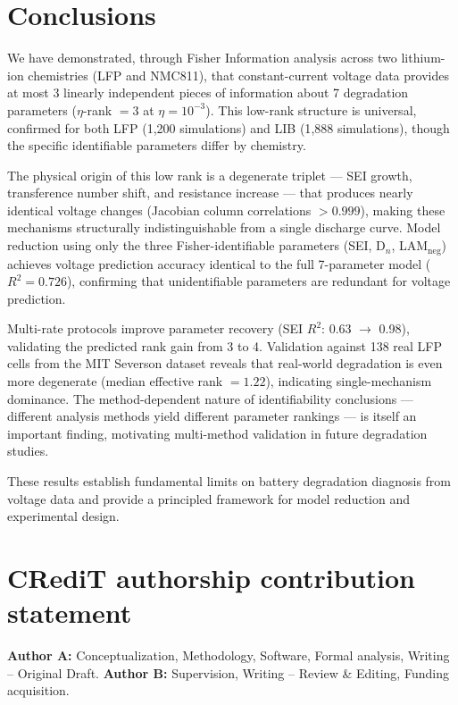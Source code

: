 \documentclass[preprint,12pt]{elsarticle}
\begin{document}
\section{Conclusions}
\label{sec:conclusion}

We have demonstrated, through Fisher Information analysis across two lithium-ion chemistries (LFP and NMC811), that constant-current voltage data provides at most 3 linearly independent pieces of information about 7 degradation parameters ($\eta$-rank $= 3$ at $\eta = 10^{-3}$).
This low-rank structure is universal, confirmed for both LFP (1{,}200 simulations) and LIB (1{,}888 simulations), though the specific identifiable parameters differ by chemistry.

The physical origin of this low rank is a degenerate triplet --- SEI growth, transference number shift, and resistance increase --- that produces nearly identical voltage changes (Jacobian column correlations $> 0.999$), making these mechanisms structurally indistinguishable from a single discharge curve.
Model reduction using only the three Fisher-identifiable parameters (SEI, D$_n$, LAM$_{\mathrm{neg}}$) achieves voltage prediction accuracy identical to the full 7-parameter model ($R^2 = 0.726$), confirming that unidentifiable parameters are redundant for voltage prediction.

Multi-rate protocols improve parameter recovery (SEI $R^2$: 0.63 $\to$ 0.98), validating the predicted rank gain from 3 to 4.
Validation against 138 real LFP cells from the MIT Severson dataset reveals that real-world degradation is even more degenerate (median effective rank $= 1.22$), indicating single-mechanism dominance.
The method-dependent nature of identifiability conclusions --- different analysis methods yield different parameter rankings --- is itself an important finding, motivating multi-method validation in future degradation studies.

These results establish fundamental limits on battery degradation diagnosis from voltage data and provide a principled framework for model reduction and experimental design.

\section*{CRediT authorship contribution statement}
\textbf{Author A:} Conceptualization, Methodology, Software, Formal analysis, Writing -- Original Draft.
\textbf{Author B:} Supervision, Writing -- Review \& Editing, Funding acquisition.
\end{document}
